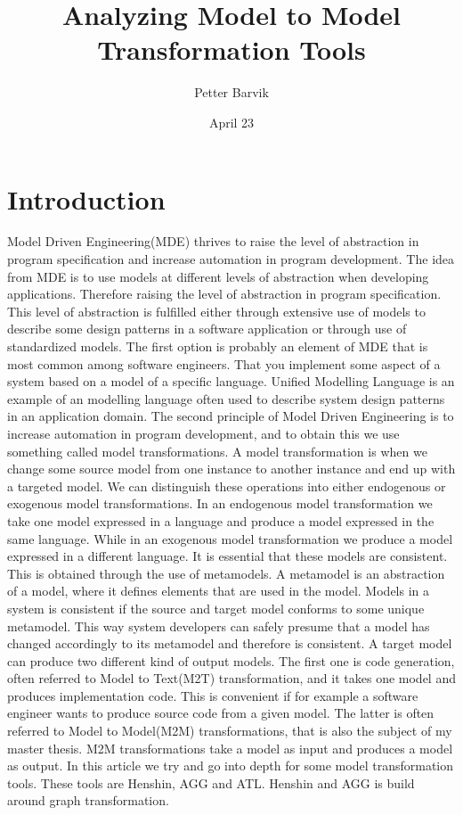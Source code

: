 \documentclass[pdftex,11pt,a4paper]{article}
\begin{document}
\title{Analyzing Model to Model Transformation
	   Tools}
\date{April 23}
\author{Petter Barvik}

\maketitle
\section{Introduction}

Model Driven Engineering(MDE)\cite{France2007} thrives to raise the level of abstraction in
program specification and increase automation in program development. The idea
from MDE is to use models at different levels of abstraction when developing
applications. Therefore raising the level of abstraction in program
specification. This level of abstraction is fulfilled either through extensive
use of models to describe some design patterns in a software application or
through use of standardized models. The first option is probably an element of
MDE that is most common among software engineers. That you implement some aspect
of a system based on a model of a specific language. Unified Modelling Language is
an example of an modelling language often used to describe system design
patterns in an application domain. The second principle of Model Driven
Engineering is to increase automation in program development, and to obtain this
we use something called model transformations. \linebreak 
\newline A model transformation is when we change some source model from one
instance to another instance and end up with a targeted model. We can
distinguish these operations into either endogenous or exogenous model
transformations. In an endogenous model transformation we take one model
expressed in a language and produce a model expressed in the same language.
While in an exogenous model transformation we produce a model expressed in a
different language. It is essential that these models are consistent. This is
obtained through the use of metamodels. A metamodel is an abstraction of a
model, where it defines elements that are used in the model. Models in a
system is consistent if the source and target model conforms to some unique 
metamodel. This way system developers can safely presume that a model has
changed accordingly to its metamodel and therefore is consistent. A target model
can produce two different kind of output models. The first one is code
generation, often referred to Model to Text(M2T) transformation, and it takes
one model and produces implementation code. This is convenient if for example a software
engineer wants to produce source code from a given model. The latter is often
referred to Model to Model(M2M) transformations, that is also the subject of
my master thesis. M2M transformations take a model as input and produces a model
as output. In this article we try and go into depth for some model
transformation tools. These tools are Henshin, AGG and ATL. Henshin and AGG is
build around graph transformation. 
\end{document}
